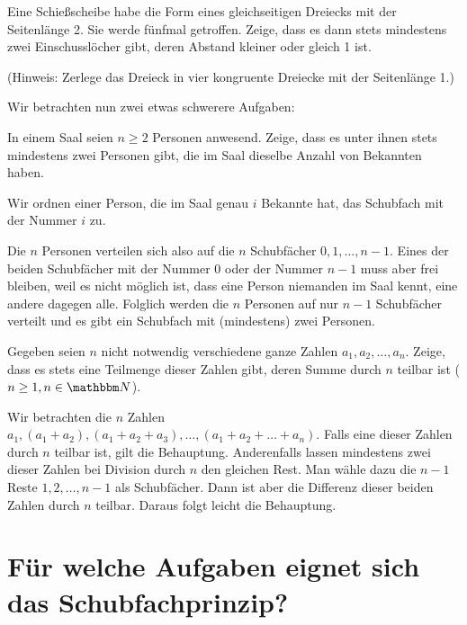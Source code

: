 \documentclass[11pt]{article}
\begin{document}
\begin{aufgabe}
  Eine Schießscheibe habe die Form eines gleichseitigen Dreiecks mit der
  Seitenlänge 2. Sie werde fünfmal getroffen. Zeige, dass es dann stets
  mindestens zwei Einschusslöcher gibt, deren Abstand kleiner oder gleich 1
  ist.
\end{aufgabe}
(Hinweis: Zerlege das Dreieck in vier kongruente Dreiecke mit der Seitenlänge
1.)

Wir betrachten nun zwei etwas schwerere Aufgaben:

\begin{aufgabe}
  In einem Saal seien $n\ge 2$ Personen anwesend. Zeige, dass es unter ihnen
  stets mindestens zwei Personen gibt, die im Saal dieselbe Anzahl von
  Bekannten haben.
\end{aufgabe}

\begin{loesung}
  Wir ordnen einer Person, die im Saal genau $i$ Bekannte hat, das
  Schubfach mit der Nummer $i$ zu.

  Die $n$ Personen verteilen sich also auf die $n$ Schubfächer $0,
  1,\dots,n-1$.  Eines der beiden Schubfächer mit der Nummer $0$ oder der
  Nummer $n-1$ muss aber frei bleiben, weil es nicht möglich ist, dass eine
  Person niemanden im Saal kennt, eine andere dagegen alle.  Folglich werden
  die $n$ Personen auf nur $n-1$ Schubfächer verteilt und es gibt ein
  Schubfach mit (mindestens) zwei Personen.
\end{loesung}

\begin{aufgabe}
  Gegeben seien $n$ nicht notwendig verschiedene ganze Zahlen $a_1, a_2,\dots,
  a_n$.  Zeige, dass es stets eine Teilmenge dieser Zahlen gibt, deren Summe
  durch $n$ teilbar ist ($n\ge 1,n\in\N$).
\end{aufgabe}
\begin{loesung}
  Wir betrachten die $n$ Zahlen $a_1, (a_1+a_2), (a_1+a_2+a_3),\dots,
  (a_1+a_2+\dots+a_n)$.  Falls eine dieser Zahlen durch $n$ teilbar ist, gilt
  die Behauptung. Anderenfalls lassen mindestens zwei dieser Zahlen bei
  Division durch $n$ den gleichen Rest. Man wähle dazu die $n-1$ Reste
  $1,2,\dots,n-1$ als Schubfächer. Dann ist aber die Differenz dieser beiden
  Zahlen durch $n$ teilbar. Daraus folgt leicht die Behauptung.
\end{loesung}

\section{Für welche Aufgaben eignet sich das Schubfachprinzip?}
\end{document}
